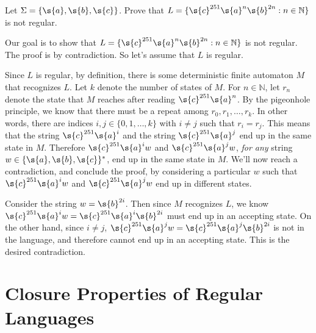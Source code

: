 \begin{flex}
\begin{exercise} \label{exercise:c251anb2n-is-not-regular}
Let $\Sigma = \{\s{a},\s{b},\s{c}\}$. Prove that $L = \{\s{c}^{251} \s{a}^n \s{b}^{2n}: n \in \mathbb{N}\}$ is not regular. 
\end{exercise}
\begin{solution}
Our goal is to show that $L = \{\s{c}^{251} \s{a}^n \s{b}^{2n}: n \in \mathbb{N}\}$ is not regular. The proof is by contradiction. So let's assume that $L$ is regular. 

Since $L$ is regular, by definition, there is some deterministic finite automaton $M$ that recognizes $L$. Let $k$ denote the number of states of $M$. For $n \in \mathbb{N}$, let $r_n$ denote the state that $M$ reaches after reading $\s{c}^{251}\s{a}^n$. By the pigeonhole principle, we know that there must be a repeat among $r_0, r_1,\ldots, r_k$. In other words, there are indices $i, j \in \{0,1,\ldots,k\}$ with $i \neq j$ such that $r_i = r_j$. This means that the string $\s{c}^{251}\s{a}^i$ and the string $\s{c}^{251}\s{a}^j$ end up in the same state in $M$. Therefore $\s{c}^{251}\s{a}^iw$ and $\s{c}^{251}\s{a}^jw$, \emph{for any} string $w \in \{\s{a},\s{b},\s{c}\}^*$, end up in the same state in $M$. We'll now reach a contradiction, and conclude the proof, by considering a particular $w$ such that $\s{c}^{251}\s{a}^iw$ and $\s{c}^{251}\s{a}^jw$ end up in different states. 

Consider the string $w = \s{b}^{2i}$. Then since $M$ recognizes $L$, we know $\s{c}^{251}\s{a}^iw = \s{c}^{251}\s{a}^i\s{b}^{2i}$ must end up in an accepting state. On the other hand, since $i \neq j$, $\s{c}^{251}\s{a}^jw = \s{c}^{251}\s{a}^j\s{b}^{2i}$ is not in the language, and therefore cannot end up in an accepting state. This is the desired contradiction.
\end{solution}
\end{flex}







\section{Closure Properties of Regular Languages}


